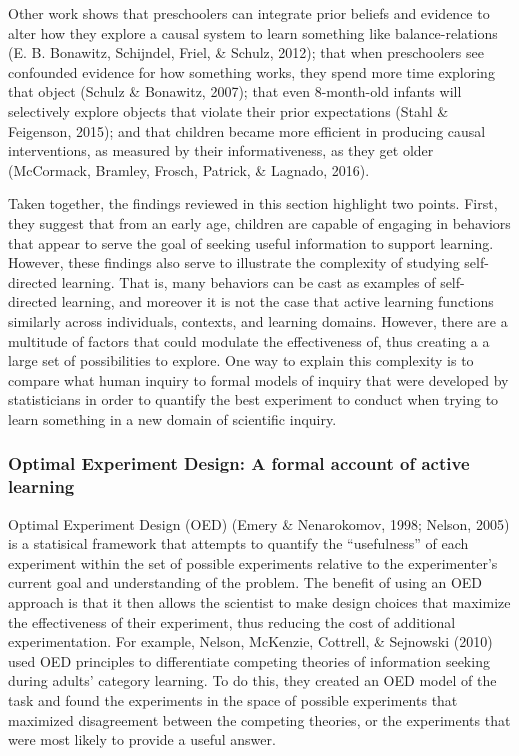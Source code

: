 \documentclass[a4paper,man,apacite,floatsintext]{apa6}
\begin{document}
Other work shows that preschoolers can integrate prior beliefs and
evidence to alter how they explore a causal system to learn something
like balance-relations (E. B. Bonawitz, Schijndel, Friel, \& Schulz,
2012); that when preschoolers see confounded evidence for how something
works, they spend more time exploring that object (Schulz \& Bonawitz,
2007); that even 8-month-old infants will selectively explore objects
that violate their prior expectations (Stahl \& Feigenson, 2015); and
that children became more efficient in producing causal interventions,
as measured by their informativeness, as they get older (McCormack,
Bramley, Frosch, Patrick, \& Lagnado, 2016).

Taken together, the findings reviewed in this section highlight two
points. First, they suggest that from an early age, children are capable
of engaging in behaviors that appear to serve the goal of seeking useful
information to support learning. However, these findings also serve to
illustrate the complexity of studying self-directed learning. That is,
many behaviors can be cast as examples of self-directed learning, and
moreover it is not the case that active learning functions similarly
across individuals, contexts, and learning domains. However, there are a
multitude of factors that could modulate the effectiveness of, thus
creating a a large set of possibilities to explore. One way to explain
this complexity is to compare what human inquiry to formal models of
inquiry that were developed by statisticians in order to quantify the
best experiment to conduct when trying to learn something in a new
domain of scientific inquiry.

\subsubsection{Optimal Experiment Design: A formal account of active
learning}\label{optimal-experiment-design-a-formal-account-of-active-learning}

Optimal Experiment Design (OED) (Emery \& Nenarokomov, 1998; Nelson,
2005) is a statisical framework that attempts to quantify the
``usefulness'' of each experiment within the set of possible experiments
relative to the experimenter's current goal and understanding of the
problem. The benefit of using an OED approach is that it then allows the
scientist to make design choices that maximize the effectiveness of
their experiment, thus reducing the cost of additional experimentation.
For example, Nelson, McKenzie, Cottrell, \& Sejnowski (2010) used OED
principles to differentiate competing theories of information seeking
during adults' category learning. To do this, they created an OED model
of the task and found the experiments in the space of possible
experiments that maximized disagreement between the competing theories,
or the experiments that were most likely to provide a useful answer.
\end{document}
